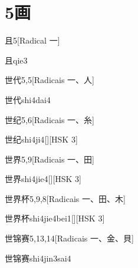 
\section*{5画}

\begin{entry}{且}{5}[Radical ⼀]
  \begin{phonetics}{且}{qie3}
  \end{phonetics}
\end{entry}

\begin{entry}{世代}{5,5}[Radicais ⼀、⼈]
  \begin{phonetics}{世代}{shi4dai4}
  \end{phonetics}
\end{entry}

\begin{entry}{世纪}{5,6}[Radicais ⼀、⽷]
  \begin{phonetics}{世纪}{shi4ji4}[][HSK 3]
  \end{phonetics}
\end{entry}

\begin{entry}{世界}{5,9}[Radicais ⼀、⽥]
  \begin{phonetics}{世界}{shi4jie4}[][HSK 3]
  \end{phonetics}
\end{entry}

\begin{entry}{世界杯}{5,9,8}[Radicais ⼀、⽥、⽊]
  \begin{phonetics}{世界杯}{shi4jie4bei1}[][HSK 3]
  \end{phonetics}
\end{entry}

\begin{entry}{世锦赛}{5,13,14}[Radicais ⼀、⾦、⾙]
  \begin{phonetics}{世锦赛}{shi4jin3sai4}
  \end{phonetics}
\end{entry}

